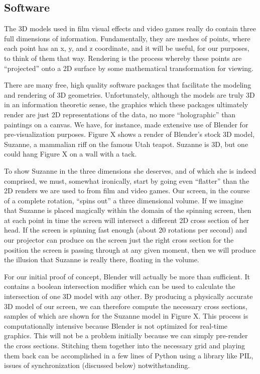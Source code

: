 \documentclass[12pt]{article}
\begin{document}
\subsection{Software}
The 3D models used in film visual effects and video games really do contain three full dimensions of information. Fundamentally, they are meshes of points, where each point has an x, y, and z coordinate, and it will be useful, for our purposes, to think of them that way. Rendering is the process whereby these points are “projected” onto a 2D surface by some mathematical transformation for viewing.

There are many free, high quality software packages that facilitate the modeling and rendering of 3D geometries. Unfortunately, although the models are truly 3D in an information theoretic sense, the graphics which these packages ultimately render are just 2D representations of the data, no more “holographic” than paintings on a canvas. We have, for instance, made extensive use of Blender for pre-visualization purposes. Figure X shows a render of Blender’s stock 3D model, Suzanne, a mammalian riff on the famous Utah teapot. Suzanne is 3D, but one could hang Figure X on a wall with a tack.

To show Suzanne in the three dimensions she deserves, and of which she is indeed comprised, we must, somewhat ironically, start by going even “flatter” than the 2D renders we are used to from film and video games. Our screen, in the course of a complete rotation, “spins out” a three dimensional volume. If we imagine that Suzanne is placed magically within the domain of the spinning screen, then at each point in time the screen will intersect a different 2D cross section of her head. If the screen is spinning fast enough (about 20 rotations per second) and our projector can produce on the screen just the right cross section for the position the screen is passing through at any given moment, then we will produce the illusion that Suzanne is really there, floating in the volume.

For our initial proof of concept, Blender will actually be more than sufficient. It contains a boolean intersection modifier which can be used to calculate the intersection of one 3D model with any other. By producing a physically accurate 3D model of our screen, we can therefore compute the necessary cross sections, samples of which are shown for the Suzanne model in Figure X. This process is computationally intensive because Blender is not optimized for real-time graphics. This will not be a problem initially because we can simply pre-render the cross sections. Stitching them together into the necessary grid and playing them back can be accomplished in a few lines of Python using a library like PIL, issues of synchronization (discussed below) notwithstanding.
\end{document}
